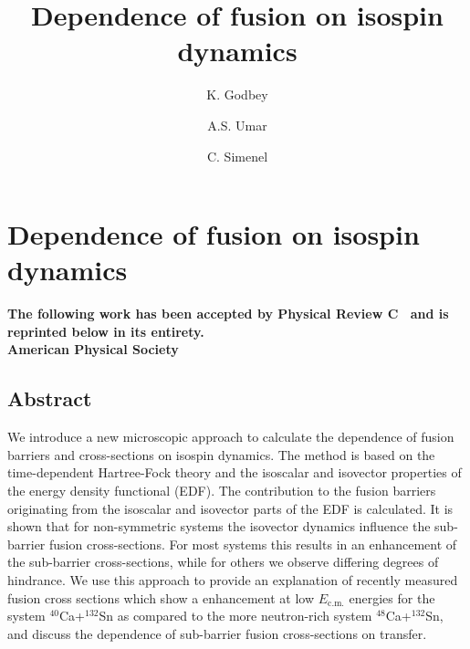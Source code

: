 
\makeatletter
\renewcommand{\AB@affillist}{}
\renewcommand{\AB@authlist}{}
\setcounter{authors}{0}
\setcounter{affil}{0}
\makeatother

\chapter{Dependence of fusion on isospin dynamics}\label{chapters:chapter_2}

{
\title{Dependence of fusion on isospin dynamics}

\author[1]{K. Godbey}
\author[1]{A.S. Umar}

\author[2]{C. Simenel}


	\bfseries\centering
	The following work has been accepted by Physical Review C~\citep{godbey2017} and is reprinted below in its entirety.\\
	 American Physical Society
	\makeatletter
	\begin{center}\large\bfseries
		\@title
		\par\end{center}
	\begin{center}
		\AB@authlist
		
		\AB@affillist
	\end{center}
	\makeatother
}
\makeatletter
\renewcommand{\AB@affillist}{}
\renewcommand{\AB@authlist}{}
\setcounter{authors}{0}
\makeatother





\section*{Abstract}
	We introduce a new microscopic approach to calculate the dependence of fusion barriers and cross-sections on
	isospin dynamics. The method is based on the time-dependent Hartree-Fock theory and
	the isoscalar and isovector properties of the energy density functional (EDF). The contribution to
	the fusion barriers originating from the isoscalar and isovector parts of the EDF is calculated.
	It is shown that for non-symmetric systems the isovector dynamics influence the sub-barrier fusion
	cross-sections. For most systems this results in an enhancement of the sub-barrier cross-sections,
	while for others we observe differing degrees of hindrance.
	We use this approach to provide an explanation of recently measured fusion cross sections which show a  enhancement at low $E_\mathrm{c.m.}$ energies
	for the system $^{40}$Ca+$^{132}$Sn as compared to the more neutron-rich system
	$^{48}$Ca+$^{132}$Sn, and discuss the dependence of sub-barrier fusion cross-sections on transfer.
	
